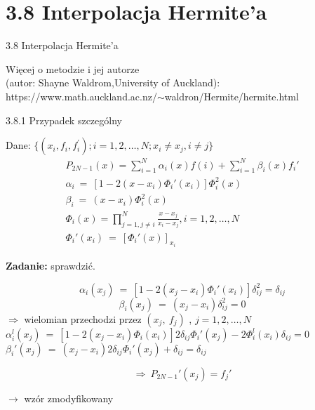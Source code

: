 \section{3.8 Interpolacja Hermite'a}
\begin{frame}
{3.8 Interpolacja Hermite'a}

Więcej o metodzie i jej autorze \\
(autor: Shayne Waldrom,University of Auckland):\\
\vspace{5mm}
https://www.math.auckland.ac.nz/$\sim$waldron/Hermite/hermite.html
\end{frame}

\begin{frame}
{3.8.1 Przypadek szczególny}

Dane: $\{(x_{i}, f_{i}, f_{i}^{'}); i=1,2, \dots, N; x_{i}\neq x_{j}, i\neq j\}$
\begin{gather*}
  P_{2N-1}(x)=\sum_{i=1}^{N}\alpha_{i}(x)f(i)+\sum_{i=1}^{N}\beta_{i}(x)f_{i}'\\
  \alpha_{i}\ =\ [1-2(x-x_{i})\Phi_{i}'(x_{i})]\Phi_{i}^{2}(x)\\
  \beta_{i}\ =\ (x-x_{i})\Phi_{i}^{2}(x)\\
  \Phi_{i}(x) = \displaystyle \prod_{j=1,j\neq i}^{N}\frac{x-x_{j}}{x_{i}-x_{j}}, i=1, 2,\dots, N\\
  \Phi_{i}'(x_{i})\ =\ [\Phi_{i}'(x)]_{x_{i}}
\end{gather*}

\textbf{Zadanie:} sprawdzić.


\end{frame}

\begin{frame}
$$
\alpha_{i}(x_{j})\ =\ [1-2(x_{j}-x_{i})\Phi_{i}'(x_{i})]\delta_{ij}^{2}=\delta_{ij}
$$
$$
\beta_{i}(x_{j})\ =\ (x_{j}-x_{i})\delta_{ij}^{2}=0
$$
$\Rightarrow$ wielomian przechodzi przez $(x_{j},\ f_{j})$ , $j=1,2, \dots, N$ \\
\vspace{3mm}
$\alpha_{i}^{l}(x_{j})\ =\ [1-2(x_{j}-x_{i})\Phi_{i}(x_{i})]2\delta_{ij}\Phi_{i}'(x_{j})-2\Phi_{i}^{l}(x_{i})\delta_{ij}=0$ \\
\vspace{3mm}
$\beta_{i}'(x_{j})\ =\ (x_{j}-x_{i})2\delta_{ij}\Phi_{i}'(x_{j})+\delta_{ij}=\delta_{ij}$

$$
\Rightarrow\ P_{2N-1}'(x_{j})=f_{j}'
$$
\begin{flushright}$\rightarrow$ wzór zmodyfikowany \end{flushright}
\end{frame}

